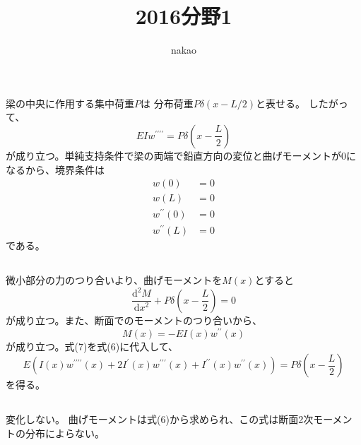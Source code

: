 \documentclass[a4paper]{jsarticle}
\begin{document}
\title{2016分野1}
\author{nakao}
\maketitle

\section{}
\subsection{}
梁の中央に作用する集中荷重$P$は
分布荷重$P \delta(x - L/2)$と表せる。
したがって、
\begin{equation}
  E I w^{\prime \prime \prime \prime} = P \delta \left(x - \frac{L}{2}\right)
\end{equation}
が成り立つ。単純支持条件で梁の両端で鉛直方向の変位と曲げモーメントが0になるから、境界条件は
\begin{align}
  w(0) &= 0 \\
  w(L) &= 0 \\
  w^{\prime \prime}(0) &= 0 \\
  w^{\prime \prime}(L) &= 0
\end{align}
である。

\subsection{}
微小部分の力のつり合いより、曲げモーメントを$M(x)$とすると
\begin{equation}
  \frac{\mathrm{d}^2 M}{\mathrm{d} x^2} + P \delta \left(x - \frac{L}{2}\right) = 0
\end{equation}
が成り立つ。また、断面でのモーメントのつり合いから、
\begin{equation}
  M(x) = -E I(x) w^{\prime \prime}(x)
\end{equation}
が成り立つ。式(7)を式(6)に代入して、
\begin{equation}
  E \left(I(x) w^{\prime \prime \prime \prime}(x) + 
  2 I^{\prime}(x) w^{\prime \prime \prime}(x) + 
  I^{\prime \prime}(x) w^{\prime \prime}(x)\right)
  = P \delta \left(x - \frac{L}{2}\right)
\end{equation}
を得る。

\subsection{}
変化しない。
曲げモーメントは式(6)から求められ、この式は断面2次モーメントの分布によらない。
\end{document}
